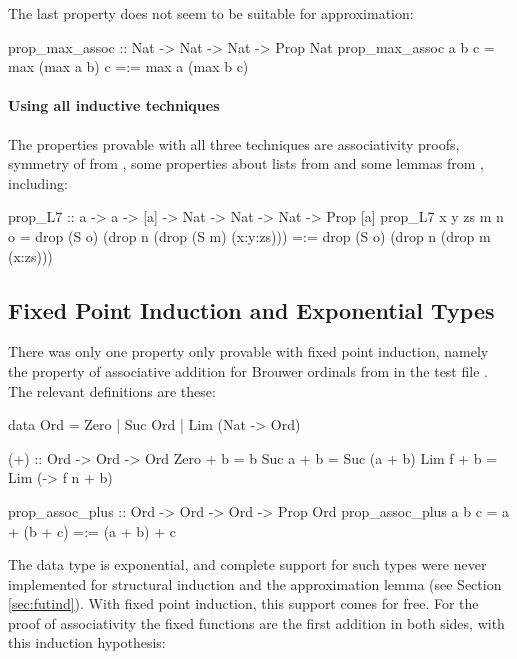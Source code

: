 The last property does not seem to be suitable for approximation:

\begin{code}
prop_max_assoc :: Nat -> Nat -> Nat -> Prop Nat
prop_max_assoc a b c = max (max a b) c =:= max a (max b c)
\end{code}

\paragraph{Using all inductive techniques}
The properties provable with all three techniques are associativity
proofs, symmetry of  from , some properties about
lists from  and some lemmas from
, including:

\begin{code}
prop_L7 :: a -> a -> [a] -> Nat -> Nat -> Nat -> Prop [a]
prop_L7 x y zs m n o = drop (S o) (drop n (drop (S m) (x:y:zs)))
                   =:= drop (S o) (drop n (drop m (x:zs)))
\end{code}

\subsection{Fixed Point Induction and Exponential Types}
There was only one property only provable with fixed point induction,
namely the property of associative addition for Brouwer ordinals from
\cite{dixonphd} in the test file . The relevant
definitions are these:

\begin{code}
data Ord = Zero | Suc Ord | Lim (Nat -> Ord)

(+) :: Ord -> Ord -> Ord
Zero  + b = b
Suc a + b = Suc (a + b)
Lim f + b = Lim (\n -> f n + b)

prop_assoc_plus :: Ord -> Ord -> Ord -> Prop Ord
prop_assoc_plus a b c = a + (b + c) =:= (a + b) + c
\end{code}

\noindent
The  data type is exponential, and complete support for such
types were never implemented for structural induction and the
approximation lemma (see Section \ref{sec:futind}). With fixed point
induction, this support comes for free. For the proof of associativity
the fixed functions are the first addition in both sides, with this
induction hypothesis:

\newcommand{\Lim}{\fn{lim}}
\newcommand{\pw}{\fixw{+}}
\newcommand{\pb}{\fixb{+}}

